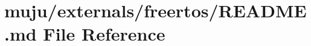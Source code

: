 \hypertarget{externals_2freertos_2_r_e_a_d_m_e_8md}{}\section{muju/externals/freertos/\+R\+E\+A\+D\+ME.md File Reference}
\label{externals_2freertos_2_r_e_a_d_m_e_8md}
